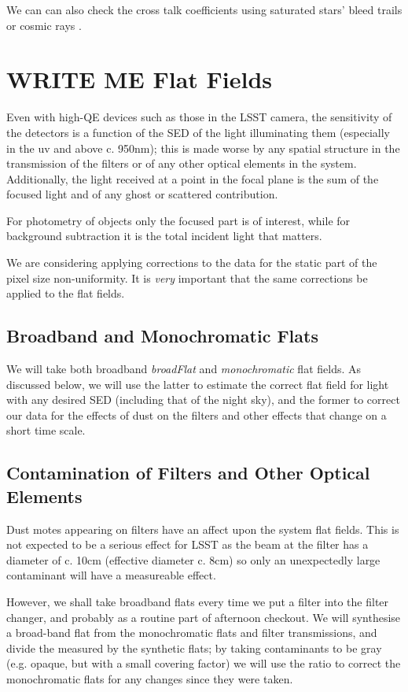 \documentclass[DM,authoryear,toc,lsstdraft]{lsstdoc}
\begin{document}
We can can also check the cross talk coefficients using saturated stars' bleed
trails or cosmic rays \citep{2012PASP..124.1347Y}.

\section{WRITE ME Flat Fields}

Even with high-QE devices such as those in the LSST camera, the sensitivity of the detectors is a function of
the SED of the light illuminating them (especially in the uv and above c. 950nm); this is made worse by any
spatial structure in the transmission of the filters or of any other optical elements in the system.
Additionally, the light received at a point in the focal plane is the sum of the focused light and of any
ghost or scattered contribution.

For photometry of objects only the focused part is of interest, while for background subtraction it is the
total incident light that matters.

We are considering applying corrections to the data for the static part of the pixel size non-uniformity.  It is
\emph{very} important that the same corrections be applied to the flat fields.

\subsection{Broadband and Monochromatic Flats}

We will take both broadband \emph{broadFlat} and \emph{monochromatic} flat fields.  As discussed below, we will use the
latter to estimate the correct flat field for light with any desired SED (including that of the night sky),
and the former to correct our data for the effects of dust on the filters and other effects that change on a
short time scale.

\subsection{Contamination of Filters and Other Optical Elements}

Dust motes appearing on filters have an affect upon the system flat fields.  This is not expected to be
a serious effect for LSST as the beam at the filter has a diameter of c. 10cm (effective diameter c. 8cm)
so only an unexpectedly large contaminant will have a measureable effect.

However, we shall take broadband flats every time we put a filter into the filter
changer, and probably as a routine part of afternoon checkout.  We will synthesise a broad-band flat from the
monochromatic flats and filter transmissions, and divide the
measured by the synthetic flats; by taking contaminants to be gray (e.g. opaque, but with a small covering
factor) we will use the ratio to correct the monochromatic flats for any changes since they were taken.
\end{document}
